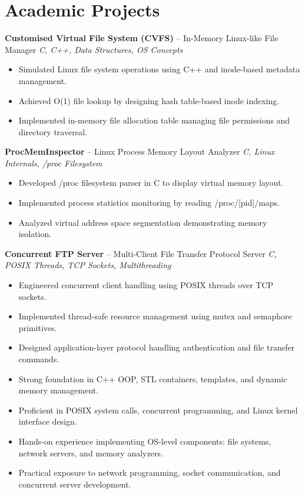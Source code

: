 \documentclass[10.5pt,a4paper]{article}
\begin{document}
\section{Academic Projects}
\textbf{Customised Virtual File System (CVFS)} -- In-Memory Linux-like File Manager \hfill \textit{C, C++, Data Structures, OS Concepts}
\begin{itemize}
  \item Simulated Linux file system operations using C++ and inode-based metadata management.
  \item Achieved O(1) file lookup by designing hash table-based inode indexing.
  \item Implemented in-memory file allocation table managing file permissions and directory traversal.
\end{itemize}
\vspace{2pt}
\textbf{ProcMemInspector} -- Linux Process Memory Layout Analyzer \hfill \textit{C, Linux Internals, /proc Filesystem}
\begin{itemize}
  \item Developed /proc filesystem parser in C to display virtual memory layout.
  \item Implemented process statistics monitoring by reading /proc/[pid]/maps.
  \item Analyzed virtual address space segmentation demonstrating memory isolation.
\end{itemize}
\vspace{2pt}
\textbf{Concurrent FTP Server} -- Multi-Client File Transfer Protocol Server \hfill \textit{C, POSIX Threads, TCP Sockets, Multithreading}
\begin{itemize}
  \item Engineered concurrent client handling using POSIX threads over TCP sockets.
  \item Implemented thread-safe resource management using mutex and semaphore primitives.
  \item Designed application-layer protocol handling authentication and file transfer commands.
\end{itemize}
\begin{itemize}
  \item Strong foundation in C++ OOP, STL containers, templates, and dynamic memory management.
  \item Proficient in POSIX system calls, concurrent programming, and Linux kernel interface design.
  \item Hands-on experience implementing OS-level components: file systems, network servers, and memory analyzers.
  \item Practical exposure to network programming, socket communication, and concurrent server development.
\end{itemize}
\end{document}

